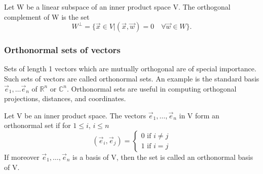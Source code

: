 \documentclass{article}
\begin{document}
		Let W be a linear subspace of an inner product space V. The orthogonal complement of W is the set
		\begin{equation*}
			W^\bot = \{\vec{x}\in V | (\vec{x},\vec{w}) = 0 \quad \forall \vec{w} \in W\}.
		\end{equation*}
		
		\subsubsection{Orthonormal sets of vectors}
		Sets of length 1 vectors which are mutually orthogonal are of special importance. Such sets of vectors are called orthonormal sets. An example is the standard basis $\vec{e}_1,\dots\vec{e}_n$ of $\mathbb{R}^n$ or $\mathbb{C}^n$. Orthonormal sets are useful in computing orthogonal projections, distances, and coordinates.
		
		Let V be an inner product space. The vectors $\vec{e}_1,\dots,\vec{e}_n$ in V form an orthonormal set if for $1 \leq i$, $i\leq n$
		  \[
				(\vec{e}_i,\vec{e}_j)=\left\{
					\begin{array}{ll}
						0 \text{ if } i \neq j \\
						1 \text{ if } i = j 
					\end{array}
				\right.
		\]
		If moreover $\vec{e}_1,\dots,\vec{e}_n$ is a basis of V, then the set is called an orthonormal basis of V.
\end{document}
